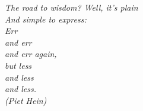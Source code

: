 \begin{epigrafe}
	\vspace*{\fill}
	\begin{flushright}
		\textit{
			The road to wisdom? Well, it's plain\\
			And simple to express:\\
			Err\\
			and err\\
			and err again,\\
			but less\\
			and less\\
			and less.\\
			(Piet Hein)
		}
	\end{flushright}
\end{epigrafe}

